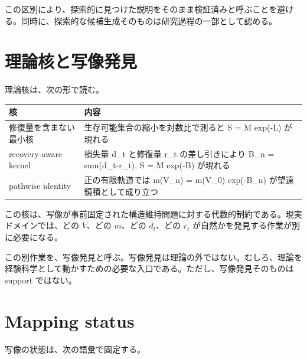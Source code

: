 \documentclass[12pt,a4paper]{article}
\begin{document}
この区別により、探索的に見つけた説明をそのまま検証済みと呼ぶことを避ける。同時に、探索的な候補生成そのものは研究過程の一部として認める。

\section{理論核と写像発見}\label{ux7406ux8ad6ux6838ux3068ux5199ux50cfux767aux898b}

理論核は、次の形で読む。

{\def\LTcaptype{table} %
\begin{longtable}[]{@{}
  >{\raggedright\arraybackslash}p{}
  >{\raggedright\arraybackslash}p{}@{}}
\toprule\noalign{}
\begin{minipage}[b]{\linewidth}\raggedright
核
\end{minipage} & \begin{minipage}[b]{\linewidth}\raggedright
内容
\end{minipage} \\
\midrule\noalign{}
\endhead
\bottomrule\noalign{}
\endlastfoot
修復量を含まない最小核 & 生存可能集合の縮小を対数比で測ると S = M exp(-L) が現れる \\
recovery-aware kernel & 損失量 d\_t と修復量 r\_t の差し引きにより B\_n = sum(d\_t-r\_t), S = M exp(-B) が現れる \\
pathwise identity & 正の有限軌道では m(V\_n) = m(V\_0) exp(-B\_n) が望遠鏡積として成り立つ \\
\end{longtable}
}

この核は、写像が事前固定された構造維持問題に対する代数的制約である。現実ドメインでは、どの \(V\)、どの \(m\)、どの \(d_{t}\)、どの \(r_{t}\) が自然かを発見する作業が別に必要になる。

この別作業を、写像発見と呼ぶ。写像発見は理論の外ではない。むしろ、理論を経験科学として動かすための必要な入口である。ただし、写像発見そのものは support ではない。

\section{Mapping status}\label{mapping-status}

写像の状態は、次の語彙で固定する。
\end{document}
